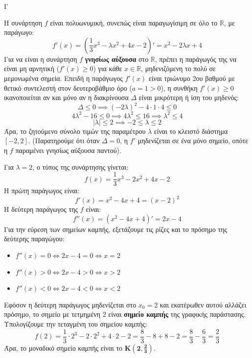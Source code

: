 \begin{thema}{Γ}
\begin{erwthma}
\item Η συνάρτηση $f$ είναι πολυωνυμική, συνεπώς είναι παραγωγίσιμη σε όλο το $\mathbb{R}$, με παράγωγο:
\[ f'(x) = \left( \frac{1}{3}x^3 - \lambda x^2 + 4x - 2 \right)' = x^2 - 2\lambda x + 4 \]
Για να είναι η συνάρτηση $f$ \textbf{γνησίως αύξουσα} στο $\mathbb{R}$, πρέπει η παράγωγός της να είναι μη αρνητική ($f'(x) \ge 0$) για κάθε $x \in \mathbb{R}$, μηδενιζόμενη το πολύ σε μεμονωμένα σημεία.
Επειδή η παράγωγος $f'(x)$ είναι τριώνυμο 2ου βαθμού με θετικό συντελεστή στον δευτεροβάθμιο όρο ($a=1>0$), η συνθήκη $f'(x) \ge 0$ ικανοποιείται αν και μόνο αν η διακρίνουσα $\Delta$ είναι μικρότερη ή ίση του μηδενός:
\[ \Delta \le 0 \implies (-2\lambda)^2 - 4 \cdot 1 \cdot 4 \le 0 \]
\[ 4\lambda^2 - 16 \le 0 \implies 4\lambda^2 \le 16 \implies \lambda^2 \le 4 \]
\[ |\lambda| \le 2 \implies -2 \le \lambda \le 2 \]
Άρα, το ζητούμενο σύνολο τιμών της παραμέτρου $\lambda$ είναι το κλειστό διάστημα $[-2, 2]$.
(Παρατηρούμε ότι όταν $\Delta=0$, η $f'$ μηδενίζεται σε ένα μόνο σημείο, οπότε η $f$ παραμένει γνησίως αύξουσα παντού).

\item Για $\lambda = 2$, ο τύπος της συνάρτησης γίνεται:
\[ f(x) = \frac{1}{3}x^3 - 2x^2 + 4x - 2 \]
Η πρώτη παράγωγος είναι:
\[ f'(x) = x^2 - 4x + 4 = (x-2)^2 \]
Η δεύτερη παράγωγος της $f$ είναι:
\[ f''(x) = (x^2 - 4x + 4)' = 2x - 4 \]
Για την εύρεση των σημείων καμπής, εξετάζουμε τις ρίζες και το πρόσημο της δεύτερης παραγώγου:
\begin{itemize}
    \item $f''(x) = 0 \Leftrightarrow 2x - 4 = 0 \Leftrightarrow x = 2$
    \item $f''(x) > 0 \Leftrightarrow 2x - 4 > 0 \Leftrightarrow x > 2$
    \item $f''(x) < 0 \Leftrightarrow 2x - 4 < 0 \Leftrightarrow x < 2$
\end{itemize}
Εφόσον η δεύτερη παράγωγος μηδενίζεται στο $x_0 = 2$ και εκατέρωθεν αυτού αλλάζει πρόσημο, το σημείο με τετμημένη $2$ είναι \textbf{σημείο καμπής} της γραφικής παράστασης.
Υπολογίζουμε την τεταγμένη του σημείου καμπής:
\[ f(2) = \frac{1}{3} \cdot 2^3 - 2 \cdot 2^2 + 4 \cdot 2 - 2 = \frac{8}{3} - 8 + 8 - 2 = \frac{8}{3} - \frac{6}{3} = \frac{2}{3} \]
Άρα, το μοναδικό σημείο καμπής είναι το $\boldsymbol{K\left(2, \frac{2}{3}\right)}$.


\end{erwthma}
\end{thema}
